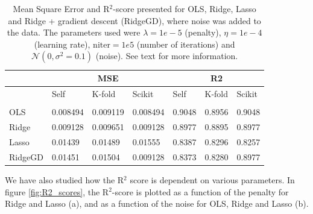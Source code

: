 \begin{table} [H]
	\caption{Mean Square Error and R$^2$-score presented for OLS, Ridge, Lasso and Ridge + gradient descent (RidgeGD), where noise was added to the data. The parameters used were $\lambda=1e-5$ (penalty), $\eta=1e-4$ (learning rate), $\text{niter}=1e5$ (number of iterations) and $\mathcal{N}(0, \sigma^2=0.1)$ (noise). See text for more information.}
	\begin{tabularx}{\textwidth}{l|XXX|XXX} \hline\hline
		\label{tab:franke_error}
		& \multicolumn{3}{c}{\textbf{MSE}}&\multicolumn{3}{c}{\textbf{R2}}\\ \hline
		&Self&K-fold&Scikit&Self&K-fold&Scikit\\ \hline \\
		OLS & 0.008494 & 0.009119 & 0.008494 & 0.9048 & 0.8956 & 0.9048 \\
		Ridge & 0.009128 & 0.009651 & 0.009128 & 0.8977 & 0.8895 & 0.8977 \\
		Lasso & 0.01439 & 0.01489 & 0.01555 & 0.8387 & 0.8296 & 0.8257 \\
		RidgeGD & 0.01451 & 0.01504 & 0.009128 & 0.8373 & 0.8280 & 0.8977 \\ \hline
	\end{tabularx}
\end{table}
We have also studied how the R$^2$ score is dependent on various parameters. In figure \eqref{fig:R2_scores}, the R$^2$-score is plotted as a function of the penalty for Ridge and Lasso (a), and as a function of the noise for OLS, Ridge and Lasso (b).

